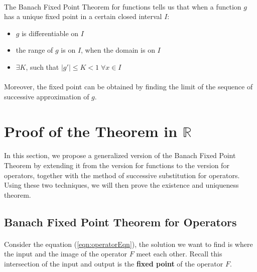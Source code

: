 \documentclass{article}
\theoremstyle{definition}
\theoremstyle{remark}
\theoremstyle{example}
\begin{document}
\paragraph{   }

The Banach Fixed Point Theorem for functions tells us that when a function $g$ has a unique fixed point in a certain closed interval $I$:
\begin{itemize}
    \item $g$ is differentiable on $I$
    \item the range of $g$ is on $I$, when the domain is on $I$
    \item $\exists K$, such that $\lvert g' \rvert \leq K < 1 \; \forall x \in I$
\end{itemize}

\paragraph{  }

Moreover, the fixed point can be obtained by finding the limit of the sequence of successive approximation of $g$.

\section{Proof of the Theorem in $\mathbb{R}$}

\paragraph{  }
In this section, we propose a generalized version of the Banach Fixed Point Theorem by extending it from the version for functions to the version for operators, together with the method of successive substitution for operators. Using these two techniques, we will then prove the existence and uniqueness theorem.

\subsection{Banach Fixed Point Theorem for Operators}

\paragraph{  }

Consider the equation (\ref{eqn:operatorEqn}), the solution we want to find is where the input and the image of the operator $F$ meet each other. Recall this intersection of the input and output is the \textbf{fixed point} of the operator $F$. 
\end{document}
